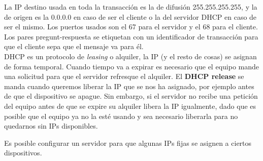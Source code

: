 La IP destino usada en toda la transacción es la de difusión 255.255.255.255, y la de origen es la 0.0.0.0 en caso de ser el cliente o la del servidor DHCP en caso de ser el mismo. Los puertos usados son el 67 para el servidor y el 68 para el cliente.\\

Los pares pregunt-respuesta se etiquetan con un identificador de transacción para que el cliente sepa que el mensaje va para él.\\

\acrshort{DHCP} es un protocolo de \textit{leasing} o alquiler, la IP (y el resto de cosas) se asignan de forma temporal. Cuando tiempo va a expirar es necesario que el equipo mande una solicitud para que el servidor refresque el alquiler. El \textbf{DHCP release} se manda cuando queremos liberar la IP que se nos ha asignado, por ejemplo antes de que el dispositivo se apague. Sin embargo, si el servidor no recibe una petición del equipo antes de que se expire su alquiler libera la IP igualmente, dado que es posible que el equipo ya no la esté usando y sea necesario liberarla para no quedarnos sin IPs disponibles. 

\begin{observacion}
    Es posible configurar un servidor para que algunas IPs fijas se asignen a ciertos dispositivos.
\end{observacion}


